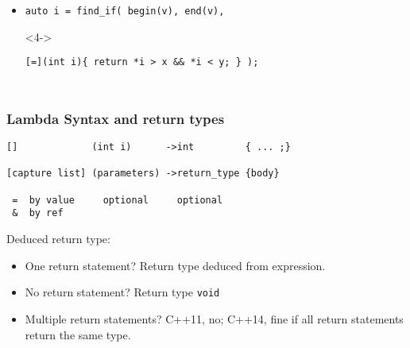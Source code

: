 \begin{frame}[fragile]
\begin{columns}[t]
\vskip 48pt
\begin{itemize}
\item  <4->{\scriptsize\begin{verbatim}auto i = find_if( begin(v), end(v), \end{verbatim}}
\item[]<4->{\scriptsize\begin{verbatim}[=](int i){ return *i > x && *i < y; } );\end{verbatim}}
\end{itemize}

\end{columns}
\end{frame}


\begin{frame}[fragile,t]
\frametitle{Lambda Syntax and return types}

{\scriptsize
\begin{verbatim}
[]             (int i)      ->int         { ... ;}

[capture list] (parameters) ->return_type {body} 

 =  by value     optional     optional
 &  by ref      
\end{verbatim}
}

Deduced return type:
\begin{itemize}
\item One return statement? Return type deduced from expression.
\item No return statement?  Return type \texttt{void}
\item Multiple return statements? C++11, no; C++14, fine if all return
  statements return the same type.
\end{itemize}
\end{frame}

